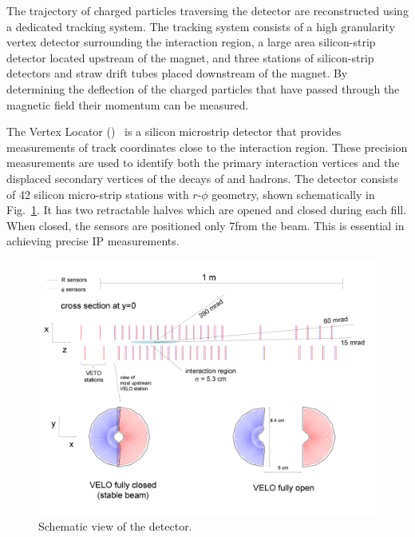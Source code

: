 The trajectory of charged particles traversing the \lhcb detector are reconstructed using a dedicated tracking system. The tracking system consists of a high granularity vertex detector surrounding the \proton\proton interaction region, a large area silicon-strip detector located upstream of the magnet, and three stations of silicon-strip detectors and straw drift tubes placed downstream of the magnet. By determining the deflection of the charged particles that have passed through the magnetic field their momentum can be measured.

The Vertex Locator (\velo)~\cite{LHCb-TDR-005,LHCb-DP-2014-001} is a silicon microstrip detector that provides measurements of track coordinates close to the \proton\proton interaction region. These precision measurements are used to identify both the primary interaction vertices and the displaced secondary vertices of the decays of \bquark and \cquark hadrons. The detector consists of 42 silicon micro-strip stations with $r$-$\phi$ geometry, shown schematically in Fig.~\ref{fig:velo}. It has two retractable halves which are opened and closed during each \lhc fill. When closed, the sensors are positioned only 7\mm from the \lhc beam. This is essential in achieving precise IP measurements.

\begin{figure}[!tb]
\centering
\includegraphics[width=\textwidth]{figs/detector/velo.png}
\caption{Schematic view of the \velo detector.}
\label{fig:velo}
\end{figure}

